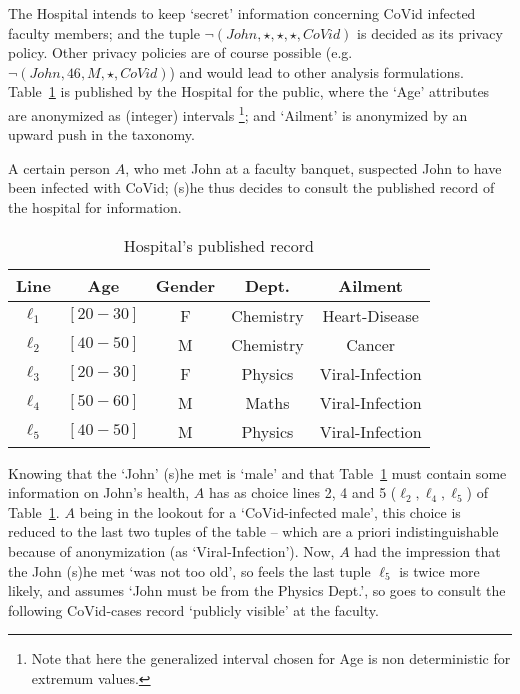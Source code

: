 \documentclass[pdflatex]{article}
\def \lft {\noindent}
\begin{document}
 \lft
 The Hospital intends to keep  `secret'  information concerning  CoVid infected
 fa\-culty members; and the tuple {$\neg(John, \star, \star, \star, CoVid)$} 
 is decided  as its privacy policy.   Other privacy policies are of course possible
 (e.g. $\neg(John, 46, M, \star, CoVid)$) and would lead to other analysis formulations.
 Table~\ref{2} is published by the Hospital for the public, where the
 `Age' attributes are anonymized as (integer) intervals
 \footnote{Note that here the generalized interval chosen for Age is non deterministic
 for extremum values.}; and `Ailment' is anonymized  by  an upward push in
 the taxonomy.

 A certain person $A$, who met John at a faculty banquet, suspected John to  have
 been infected with CoVid; (s)he thus decides to consult the published record  of the
 hospital   for  information.  

 \begin{table}[h]
   \centering
    \begin{tabular}{| c| c| c| c|c|}
  \hline
  Line & Age & Gender &  Dept.  & Ailment  \\
  \hline
    $\ell_1$ & $[20-30]$ & F  &  Chemistry  & Heart-Disease  \\
    $\ell_2$ & $[40-50]$  & M  &  Chemistry & Cancer  \\
    $\ell_3$ & $[20-30]$  & F &   Physics     &  Viral-Infection   \\
    $\ell_4$ & $[50-60]$  & M  &   Maths  &  Viral-Infection \\
    $\ell_5$ & $[40-50]$  &  M  &   Physics   &   Viral-Infection   \\
    \hline
   \end{tabular}
    \caption{\label{2} Hospital's published record }
  \vspace*{-1em}
 \end{table}
 
   Knowing that the `John'  (s)he met is `male' and  that Table~\ref{2} must contain
   some information on  John's health, $A$  has as  choice   lines 2, 4 and 5
   ($\ell_2, \ell_4, \ell_5$)   of  Table~\ref{2}.
   $A$ being in the lookout  for a `CoVid-infected  male', this choice is reduced to the last
   two tuples of the table -- which are a priori indistinguishable because of ano\-nymization
   (as `Viral-Infection').  Now, $A$ had the impression  that the John (s)he  met `was not too
   old',  so feels the last tuple $\ell_5$ is twice more likely, and {assumes}    `John must
   be from the   Physics Dept.', so goes to  consult the  following CoVid-cases   record
   `publicly visible' at  the faculty.
   
\end{document}
